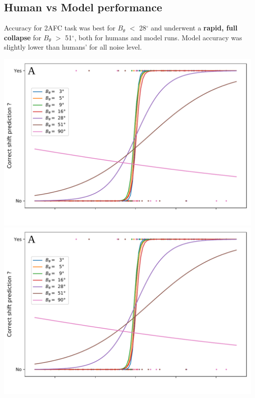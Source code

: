 \documentclass[a0,portrait]{a0poster}
\begin{document}
\begin{multicols}{3}
\subsection*{Human vs Model performance}
Accuracy for 2AFC task was best for $B_\theta$ $<$ 28$^\circ$ and underwent a \textbf{rapid, full collapse} for $B_\theta$ $>$ 51$^\circ$, both for humans and model runs. Model accuracy was slightly lower than humans' for all noise level.
\begin{center}\vspace{1cm}
\includegraphics[width=1.\linewidth, page=1]{mergedfigs.pdf}
\includegraphics[width=1.\linewidth, page=2]{mergedfigs.pdf}
\end{center}\vspace{1cm}



\end{multicols}
\end{document}

